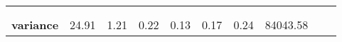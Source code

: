 \begin{table*}[h]
\begin{tabular}{llllllllll}
                                        &                                   &                                         &                                     &                                        &                                       &                                        &                                    &                                    &                                 \\ 
                                        &                                   &                                         &                                     &                                        &                                       &                                        &                                    &                                    &                                 \\ \cline{1-8}
\multicolumn{1}{|l|}{\textbf{variance}} & \multicolumn{1}{l|}{24.91}        & \multicolumn{1}{l|}{1.21}               & \multicolumn{1}{l|}{0.22}           & \multicolumn{1}{l|}{0.13}              & \multicolumn{1}{l|}{0.17}             & \multicolumn{1}{l|}{0.24}              & \multicolumn{1}{l|}{84043.58}      &                                    &                                 \\ \cline{1-8}
\end{tabular}
\end{table*}
